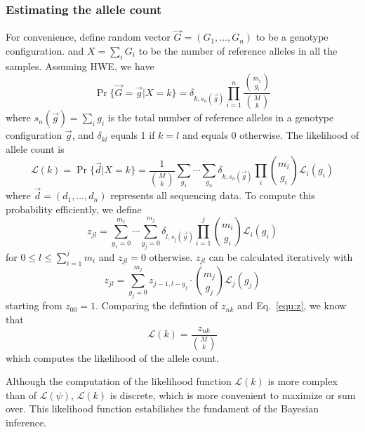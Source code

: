 \documentclass{bioinfo}
\begin{document}
\begin{methods}
\subsubsection{Estimating the allele count}
For convenience, define random vector $\vec{G}=(G_1,\ldots,G_n)$ to be a genotype configuration.
and $X=\sum_iG_i$ to be the number of reference alleles in all the samples.
Assuming HWE, we have
$$
\Pr\{\vec{G}=\vec{g}|X=k\}=\delta_{k,s_n(\vec{g})}\prod_{i=1}^n\frac{\binom{m_i}{g_i}}{\binom{M}{k}}
$$
where $s_n(\vec{g})=\sum_i g_i$ is the total
number of reference alleles in a genotype configuration $\vec{g}$, and $\delta_{kl}$ equals 1 if $k=l$
and equals 0 otherwise. The likelihood of allele count is
\begin{equation}\label{equ:klk}
\mathcal{L}(k)=\Pr\{\vec{d}|X=k\}=\frac{1}{\binom{M}{k}}\sum_{g_1}\cdots\sum_{g_n}\delta_{k,s_n(\vec{g})}\prod_i\binom{m_i}{g_i}\mathcal{L}_i(g_i)
\end{equation}
where $\vec{d}=(d_1,\ldots,d_n)$ represents all sequencing data. To compute this probability efficiently, we define
\begin{equation}\label{eq:z-def}
z_{jl}=\sum_{g_1=0}^{m_1}\cdots\sum_{g_j=0}^{m_j}\delta_{l,s_j(\vec{g})}\prod_{i=1}^j\binom{m_i}{g_i}\mathcal{L}_i(g_i)
\end{equation}
for $0\le l\le \sum_{i=1}^jm_i$ and $z_{jl}=0$ otherwise. $z_{jl}$
can be calculated iteratively with
\begin{equation}\label{equ:z}
z_{jl}=\sum_{g_j=0}^{m_j}z_{j-1,l-g_j}\cdot\binom{m_j}{g_j}\mathcal{L}_j(g_j)
\end{equation}
starting from $z_{00}=1$. Comparing the defintion of $z_{nk}$ and Eq.~\eqref{equ:z}, we know that
\begin{equation}\label{equ:klk2}
\mathcal{L}(k)=\frac{z_{nk}}{\binom{M}{k}}
\end{equation}
which computes the likelihood of the allele count.

Although the computation of the likelihood function $\mathcal{L}(k)$ is
more complex than of $\mathcal{L}(\psi)$, $\mathcal{L}(k)$ is discrete, which
is more convenient to maximize or sum over. This likelihood function
estabilishes the fundament of the Bayesian inference.


\end{methods}
\end{document}
